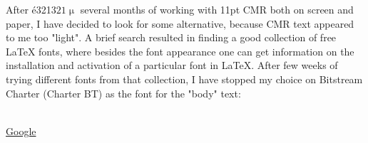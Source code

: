 \documentclass{reportex}
\begin{document}
\protusion{\tableofcontents} %
\listoffigures                        %


After é321$321\upmu$ several months of working with 11pt CMR both on screen and paper, I have decided to look for some alternative, because CMR text appeared to me too "light". A brief search resulted in finding a good collection of free LaTeX fonts, where besides the font appearance one can get information on the installation and activation of a particular font in LaTeX. After few weeks of trying different fonts from that collection, I have stopped my choice on Bitstream Charter (Charter BT) as the font for the "body" text:

\\
\href{http://www.google.com}{Google}
\end{document}
